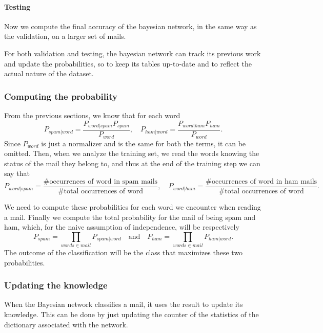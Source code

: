 \paragraph{Testing}
Now we compute the final accuracy of the bayesian network, in the same way as the validation, on a larger set of mails.

For both validation and testing, the bayesian network can track its previous work and update the probabilities, so to keep its tables up-to-date and to reflect the actual nature of the dataset.

\subsubsection{Computing the probability}
\label{computeprob}
From the previous sections, we know that for each word $$P_{spam|word} = \frac{P_{word|spam}P_{spam}}{P_{word}}, \quad P_{ham|word} = \frac{P_{word|ham}P_{ham}}{P_{word}}.$$ Since $P_{word}$ is just a normalizer and is the same for both the terms, it can be omitted. Then, when we analyze the training set, we read the words knowing the status of the mail they belong to, and thus at the end of the training step we can say that $$P_{word|spam} = \frac{\mbox{\# occurrences of word in spam mails}}{\mbox{\# total occurrences of word}}, \quad P_{word|ham} = \frac{\mbox{\# occurrences of word in ham mails}}{\mbox{\# total occurrences of word}}.$$

We need to compute these probabilities for each word we encounter when reading a mail. Finally we compute the total probability for the mail of being spam and ham, which, for the naive assumption of independence, will be respectively $$P_{spam} = \prod_{words \in mail} P_{spam|word} \quad\mbox{and}\quad P_{ham} = \prod_{words \in mail} P_{ham|word}.$$ The outcome of the classification will be the class that maximizes these two probabilities.

\subsubsection{Updating the knowledge}
When the Bayesian network classifies a mail, it uses the result to update its knowledge. This can be done by just updating the counter of the statistics of the dictionary associated with the network.
